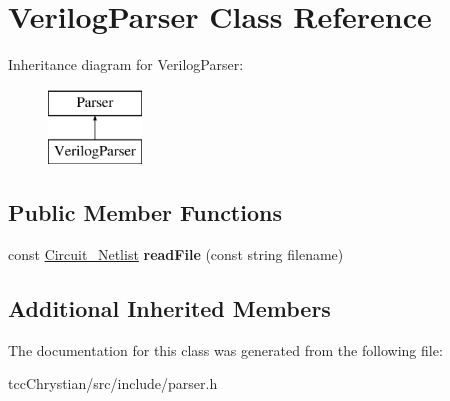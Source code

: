 \hypertarget{classVerilogParser}{\section{Verilog\-Parser Class Reference}
\label{classVerilogParser}
}
Inheritance diagram for Verilog\-Parser\-:\begin{figure}[H]
\begin{center}
\leavevmode
\includegraphics[height=2.000000cm]{classVerilogParser}
\end{center}
\end{figure}
\subsection*{Public Member Functions}
\begin{DoxyCompactItemize}
\item 
\hypertarget{classVerilogParser_a9f8740c184e8129a87597a1eae3ed3c4}{const \hyperlink{classCircuit__Netlist}{Circuit\-\_\-\-Netlist} {\bfseries read\-File} (const string filename)}\label{classVerilogParser_a9f8740c184e8129a87597a1eae3ed3c4}

\end{DoxyCompactItemize}
\subsection*{Additional Inherited Members}


The documentation for this class was generated from the following file\-:\begin{DoxyCompactItemize}
\item 
tcc\-Chrystian/src/include/parser.\-h\end{DoxyCompactItemize}
